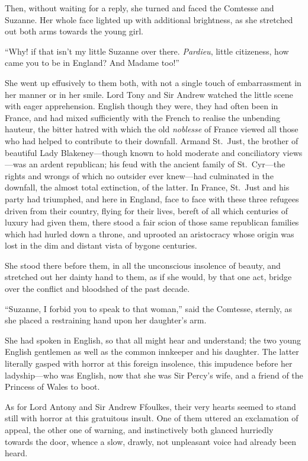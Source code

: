 \documentclass[paper=a5,BCOR=7mm,twoside,DIV=calc,12pt,usegeometry,chapterprefix,endperiod,headings=big]{scrbook}
\begin{document}
Then, without waiting for a reply, she turned and faced the Comtesse and Suzanne. Her whole face lighted up with additional brightness, as she stretched out both arms towards the young girl.

\enquote{Why! if that isn't my little Suzanne over there. \textit{Pardieu}, little citizeness, how came you to be in England? And Madame too!}

She went up effusively to them both, with not a single touch of embarrassment in her manner or in her smile. Lord Tony and Sir Andrew watched the little scene with eager apprehension. English though they were, they had often been in France, and had mixed sufficiently with the French to realise the unbending hauteur, the bitter hatred with which the old \textit{noblesse} of France viewed all those who had helped to contribute to their downfall. Armand St.~Just, the brother of beautiful Lady Blakeney---though known to hold moderate and conciliatory views---was an ardent republican; his feud with the ancient family of St.~Cyr---the rights and wrongs of which no outsider ever knew---had culminated in the downfall, the almost total extinction, of the latter. In France, St.~Just and his party had triumphed, and here in England, face to face with these three refugees driven from their country, flying for their lives, bereft of all which centuries of luxury had given them, there stood a fair scion of those same republican families which had hurled down a throne, and uprooted an aristocracy whose origin was lost in the dim and distant vista of bygone centuries.

She stood there before them, in all the unconscious insolence of beauty, and stretched out her dainty hand to them, as if she would, by that one act, bridge over the conflict and bloodshed of the past decade.

\enquote{Suzanne, I forbid you to speak to that woman,} said the Comtesse, sternly, as she placed a restraining hand upon her daughter's arm.

She had spoken in English, so that all might hear and understand; the two young English gentlemen as well as the common innkeeper and his daughter. The latter literally gasped with horror at this foreign insolence, this impudence before her ladyship---who was English, now that she was Sir Percy's wife, and a friend of the Princess of Wales to boot.

As for Lord Antony and Sir Andrew Ffoulkes, their very hearts seemed to stand still with horror at this gratuitous insult. One of them uttered an exclamation of appeal, the other one of warning, and instinctively both glanced hurriedly towards the door, whence a slow, drawly, not unpleasant voice had already been heard.
\end{document}
